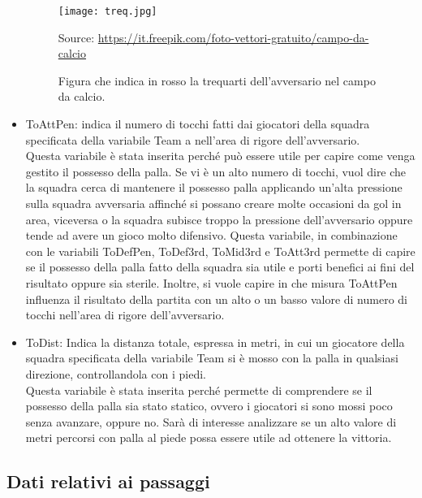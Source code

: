 \begin{itemize}
	\begin{figure}[!ht]
		\begin{center}
			\texttt{[image: treq.jpg]}
			\caption{Figura che indica in rosso la trequarti dell'avversario nel campo da calcio.} 
			Source: \url{https://it.freepik.com/foto-vettori-gratuito/campo-da-calcio} 
			\label{fig:treq}
		\end{center}
	\end{figure}
	
	\item \textsf{ToAttPen}: indica il numero di tocchi fatti dai giocatori della squadra specificata della variabile \textsf{Team} a nell'area di rigore dell'avversario. \\
	Questa variabile è stata inserita perché può essere utile per capire come venga gestito il possesso della palla. Se vi è un alto numero di tocchi, vuol dire che la squadra cerca di mantenere il possesso palla applicando un'alta pressione sulla squadra avversaria affinché si possano creare molte occasioni da gol in area, viceversa o la squadra subisce troppo la pressione dell'avversario oppure tende ad avere un gioco molto difensivo. Questa variabile, in combinazione con le variabili \textsf{ToDefPen}, \textsf{ToDef3rd}, \textsf{ToMid3rd} e \textsf{ToAtt3rd} permette di capire se il possesso della palla fatto della squadra sia utile e porti benefici ai fini del risultato oppure sia sterile. Inoltre, si vuole capire in che misura \textsf{ToAttPen} influenza il risultato della partita con un alto o un basso valore di numero di tocchi nell'area di rigore dell'avversario.
	\item \textsf{ToDist}: Indica la distanza totale, espressa in metri, in cui un giocatore della squadra specificata della variabile \textsf{Team} si è mosso con la palla in qualsiasi direzione, controllandola con i piedi.\\
	Questa variabile è stata inserita perché permette di comprendere se il possesso della palla sia stato statico, ovvero i giocatori si sono mossi poco senza avanzare, oppure no. Sarà di interesse analizzare se un alto valore di metri percorsi con palla al piede possa essere utile ad ottenere la vittoria.
	
\end{itemize}

\subsection{Dati relativi ai passaggi}

